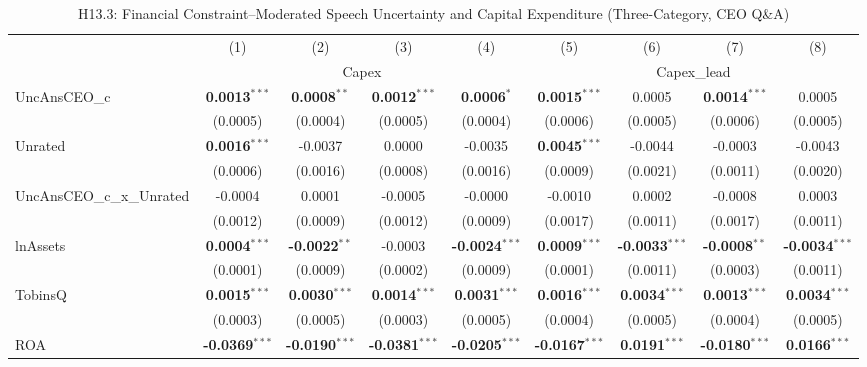 \begin{landscape}
\begin{table}[H]
\setlength{\tabcolsep}{3pt}
\renewcommand{\arraystretch}{0.85}
\centering
\caption{H13.3: Financial Constraint--Moderated Speech Uncertainty and Capital Expenditure (Three-Category, CEO Q\&A)}
\label{tab:h13_3}
\scriptsize
\begin{tabular}{lcccccccc}
\toprule
 & (1) & (2) & (3) & (4) & (5) & (6) & (7) & (8) \\
 & \multicolumn{4}{c}{Capex} & \multicolumn{4}{c}{Capex\_lead} \\
\cmidrule(lr){2-5} \cmidrule(lr){6-9}
\midrule
UncAnsCEO\_c & \textbf{0.0013}$^{***}$ & \textbf{0.0008}$^{**}$ & \textbf{0.0012}$^{***}$ & \textbf{0.0006}$^{*}$ & \textbf{0.0015}$^{***}$ & 0.0005 & \textbf{0.0014}$^{***}$ & 0.0005 \\
 & (0.0005) & (0.0004) & (0.0005) & (0.0004) & (0.0006) & (0.0005) & (0.0006) & (0.0005) \\
Unrated & \textbf{0.0016}$^{***}$ & -0.0037 & 0.0000 & -0.0035 & \textbf{0.0045}$^{***}$ & -0.0044 & -0.0003 & -0.0043 \\
 & (0.0006) & (0.0016) & (0.0008) & (0.0016) & (0.0009) & (0.0021) & (0.0011) & (0.0020) \\
UncAnsCEO\_c\_x\_Unrated & -0.0004 & 0.0001 & -0.0005 & -0.0000 & -0.0010 & 0.0002 & -0.0008 & 0.0003 \\
 & (0.0012) & (0.0009) & (0.0012) & (0.0009) & (0.0017) & (0.0011) & (0.0017) & (0.0011) \\
\midrule
lnAssets & \textbf{0.0004}$^{***}$ & \textbf{-0.0022}$^{**}$ & -0.0003 & \textbf{-0.0024}$^{***}$ & \textbf{0.0009}$^{***}$ & \textbf{-0.0033}$^{***}$ & \textbf{-0.0008}$^{**}$ & \textbf{-0.0034}$^{***}$ \\
 & (0.0001) & (0.0009) & (0.0002) & (0.0009) & (0.0001) & (0.0011) & (0.0003) & (0.0011) \\
TobinsQ & \textbf{0.0015}$^{***}$ & \textbf{0.0030}$^{***}$ & \textbf{0.0014}$^{***}$ & \textbf{0.0031}$^{***}$ & \textbf{0.0016}$^{***}$ & \textbf{0.0034}$^{***}$ & \textbf{0.0013}$^{***}$ & \textbf{0.0034}$^{***}$ \\
 & (0.0003) & (0.0005) & (0.0003) & (0.0005) & (0.0004) & (0.0005) & (0.0004) & (0.0005) \\
ROA & \textbf{-0.0369}$^{***}$ & \textbf{-0.0190}$^{***}$ & \textbf{-0.0381}$^{***}$ & \textbf{-0.0205}$^{***}$ & \textbf{-0.0167}$^{***}$ & \textbf{0.0191}$^{***}$ & \textbf{-0.0180}$^{***}$ & \textbf{0.0166}$^{***}$ \\

\end{tabular}
\end{table}
\end{landscape}
